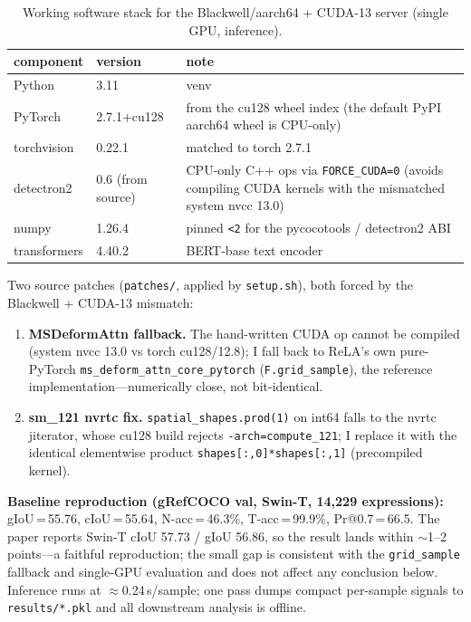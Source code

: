 \documentclass[11pt]{article}
\newcommand{\code}[1]{\texttt{\small #1}}
\begin{document}
\begin{table}[t]
\centering\small
\caption{Working software stack for the Blackwell/aarch64 + CUDA-13 server (single GPU, inference).}
\label{tab:env}
\begin{tabular}{@{}l l p{8.3cm}@{}}
\toprule
component & version & note \\
\midrule
Python & 3.11 & venv \\
PyTorch & 2.7.1+cu128 & from the cu128 wheel index (the default PyPI aarch64 wheel is CPU-only) \\
torchvision & 0.22.1 & matched to torch 2.7.1 \\
detectron2 & 0.6 (from source) & CPU-only C++ ops via \code{FORCE\_CUDA=0} (avoids compiling CUDA kernels with the mismatched system nvcc 13.0) \\
numpy & 1.26.4 & pinned \code{<2} for the pycocotools / detectron2 ABI \\
transformers & 4.40.2 & BERT-base text encoder \\
\bottomrule
\end{tabular}
\end{table}

\noindent Two source patches (\code{patches/}, applied by \code{setup.sh}), both forced by the
Blackwell + CUDA-13 mismatch:
\begin{enumerate}
\item \textbf{MSDeformAttn fallback.} The hand-written CUDA op cannot be compiled (system nvcc 13.0
vs torch cu128/12.8); I fall back to ReLA's own pure-PyTorch \code{ms\_deform\_attn\_core\_pytorch}
(\code{F.grid\_sample}), the reference implementation---numerically close, not bit-identical.
\item \textbf{sm\_121 nvrtc fix.} \code{spatial\_shapes.prod(1)} on int64 falls to the nvrtc
jiterator, whose cu128 build rejects \code{-arch=compute\_121}; I replace it with the identical
elementwise product \code{shapes[:,0]*shapes[:,1]} (precompiled kernel).
\end{enumerate}

\noindent\textbf{Baseline reproduction (gRefCOCO val, Swin-T, 14{,}229 expressions):}
gIoU\,=\,55.76, cIoU\,=\,55.64, N-acc\,=\,46.3\%, T-acc\,=\,99.9\%, Pr@0.7\,=\,66.5. The paper reports
Swin-T cIoU 57.73 / gIoU 56.86, so the result lands within $\sim$1--2 points---a faithful
reproduction; the small gap is consistent with the \code{grid\_sample} fallback and single-GPU
evaluation and does not affect any conclusion below. Inference runs at $\approx$0.24\,s/sample; one
pass dumps compact per-sample signals to \code{results/*.pkl} and all downstream analysis is offline.
\end{document}
